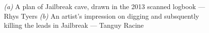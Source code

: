 	\begin{figure}[t!]
		\checkoddpage \ifoddpage \forcerectofloat \else \forceversofloat \fi
		\centering

		\begin{subfigure}{\textwidth}
			\centering
			\caption{}\label{}
		\end{subfigure}

		\begin{subfigure}{\textwidth}
			\centering
			\caption{}\label{}
		\end{subfigure}
	\caption{
		\emph{(a)} A plan of Jailbreak cave, drawn in the 2013 scanned logbook --- Rhys Tyers
		\emph{(b)} An artist's impression on digging and subsquently killing the leads in Jailbreak --- Tanguy Racine
		}
	
	\end{figure}

